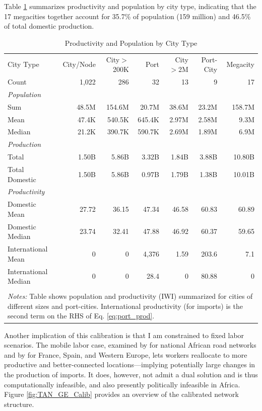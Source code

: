 \documentclass[a4paper]{article}
\begin{document}
Table \ref{tab:GE_Prod} summarizes productivity and population by city type, indicating that the 17 megacities together account for 35.7\% of population (159 million) and 46.5\% of total domestic production. 
\begin{table}[H] \centering
\caption{\label{tab:GE_Prod} Productivity and Population by City Type}
\vspace{2mm}
\begin{tabular}{lrrrrrr} \toprule
  City Type & City/Node & City$>$200K & Port & City$>$2M & Port-City & Megacity  \\ 
  Count & 1,022 & 286 & 32 & 13 & 9 & 17 \\ \midrule
  \textit{Population} \\
  Sum & 48.5M & 154.6M & 20.7M & 38.6M & 23.2M & 158.7M \\ 
  Mean & 47.4K & 540.5K & 645.4K & 2.97M & 2.58M & 9.3M \\ 
  Median & 21.2K & 390.7K & 590.7K & 2.69M & 1.89M & 6.9M \\  \midrule
  \textit{Production} \\
  Total & 1.50B & 5.86B & 3.32B & 1.84B & 3.88B & 10.80B \\ 
  Total Domestic & 1.50B & 5.86B & 0.97B & 1.79B & 1.38B & 10.01B \\  \midrule
  \textit{Productivity} \\
  Domestic Mean & 27.72 & 36.15 & 47.34 & 46.58 & 60.83 & 60.89 \\ 
  Domestic Median & 23.74 & 32.41 & 47.88 & 46.92 & 60.37 & 59.65 \\ 
  International Mean & 0 & 0 & 4,376 & 1.59 & 203.6 & 7.1 \\ 
  International Median & 0 & 0 & 28.4 & 0 & 80.88 & 0 \\ 
     \bottomrule  \\ [-0.9em]
\multicolumn{7}{l}{\parbox{0.95\textwidth}{\footnotesize
\textit{Notes:} Table shows population and productivity (IWI) summarized for cities of different sizes and port-cities. International productivity (for imports) is the second term on the RHS of Eq. \ref{eq:port_prod}. }}
\end{tabular}
\end{table}


Another implication of this calibration is that I am constrained to fixed labor scenarios. The mobile labor case, examined by \citet{graff2019spatial} for national African road networks and by \citet{fajgelbaum2020optimal} for France, Spain, and Western Europe, lets workers reallocate to more productive and better-connected locations---implying potentially large changes in the production of imports. It does, however, not admit a dual solution and is thus computationally infeasible, and also presently politically infeasible in Africa. Figure \ref{fig:TAN_GE_Calib} provides an overview of the calibrated network structure. 
\end{document}
